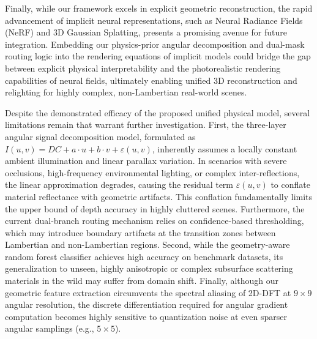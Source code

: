 Finally, while our framework excels in explicit geometric reconstruction, the rapid advancement of implicit neural representations, such as Neural Radiance Fields (NeRF) and 3D Gaussian Splatting, presents a promising avenue for future integration. Embedding our physics-prior angular decomposition and dual-mask routing logic into the rendering equations of implicit models could bridge the gap between explicit physical interpretability and the photorealistic rendering capabilities of neural fields, ultimately enabling unified 3D reconstruction and relighting for highly complex, non-Lambertian real-world scenes.

Despite the demonstrated efficacy of the proposed unified physical model, several limitations remain that warrant further investigation. First, the three-layer angular signal decomposition model, formulated as $I(u,v) = DC + a\cdot u + b\cdot v + \varepsilon(u,v)$, inherently assumes a locally constant ambient illumination and linear parallax variation. In scenarios with severe occlusions, high-frequency environmental lighting, or complex inter-reflections, the linear approximation degrades, causing the residual term $\varepsilon(u,v)$ to conflate material reflectance with geometric artifacts. This conflation fundamentally limits the upper bound of depth accuracy in highly cluttered scenes. Furthermore, the current dual-branch routing mechanism relies on confidence-based thresholding, which may introduce boundary artifacts at the transition zones between Lambertian and non-Lambertian regions. Second, while the geometry-aware random forest classifier achieves high accuracy on benchmark datasets, its generalization to unseen, highly anisotropic or complex subsurface scattering materials in the wild may suffer from domain shift. Finally, although our geometric feature extraction circumvents the spectral aliasing of 2D-DFT at $9 \times 9$ angular resolution, the discrete differentiation required for angular gradient computation becomes highly sensitive to quantization noise at even sparser angular samplings (e.g., $5 \times 5$).

